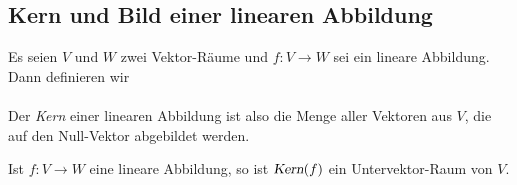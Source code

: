 \subsection{Kern und Bild einer linearen Abbildung}
\begin{Definition}[Kern]
  Es seien $V$ und $W$ zwei Vektor-R\"{a}ume und $f:V \rightarrow W$ sei ein lineare Abbildung.  Dann definieren wir 
  \\[0.2cm]
  \hspace*{1.3cm}
  \colorbox{red}{}
  \\[0.2cm] 
  Der \emph{\color{blue}Kern} einer linearen Abbildung ist also die Menge aller Vektoren aus $V$, die auf den Null-Vektor abgebildet werden.  \eoxs
\end{Definition}

\begin{Satz}
  Ist $f:V \rightarrow W$ eine lineare Abbildung, so ist $\textsl{Kern}(f)$ ein Untervektor-Raum von $V$.
\end{Satz}

